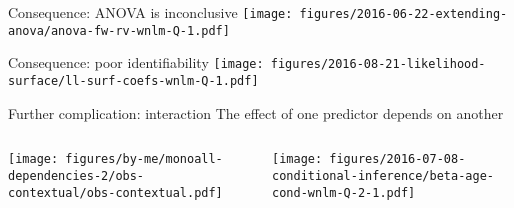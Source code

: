 \documentclass{beamer}
\newcommand{\platefigscale}[0]{0.7}
\newcommand{\ownfigscale}[0]{0.4}
\begin{document}
\begin{frame}{Consequence: ANOVA is inconclusive}
\texttt{[image: figures/2016-06-22-extending-anova/anova-fw-rv-wnlm-Q-1.pdf]}
\end{frame}

\begin{frame}{Consequence: poor identifiability}
\texttt{[image: figures/2016-08-21-likelihood-surface/ll-surf-coefs-wnlm-Q-1.pdf]}
\end{frame}

\begin{frame}{Further complication: interaction}
{The effect of one predictor depends on another}
\begin{columns}[t]
\begin{column}{0.4\textwidth}

\texttt{[image: figures/by-me/monoall-dependencies-2/obs-contextual/obs-contextual.pdf]}
\end{column}

\begin{column}{0.6\textwidth}

\texttt{[image: figures/2016-07-08-conditional-inference/beta-age-cond-wnlm-Q-2-1.pdf]}
\end{column}
\end{columns}
\end{frame}
\end{document}
